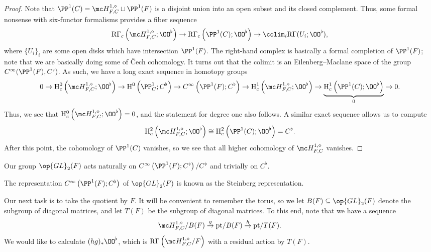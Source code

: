 \documentclass[../notes.tex]{subfiles}
\begin{document}
\begin{proof}
	Note that $\PP^1(C)=\mc H^{1,\diamond}_{F,C}\sqcup\PP^1(F)$ is a disjoint union into an open subset and its closed complement. Thus, some formal nonsense with six-functor formalisms provides a fiber sequence
	\[\mathrm R\Gamma_c\left(\mc H^{1,\diamond}_{F,C};\OO^\flat\right)\to\mathrm R\Gamma_c\left(\PP^1(C);\OO^\flat\right)\to\colim_i\mathrm R\Gamma(U_i;\OO^\flat),\]
	where $\{U_i\}_i$ are some open disks which have intersection $\PP^1(F)$. The right-hand complex is basically a formal completion of $\PP^1(F)$; note that we are basically doing some of \v{C}ech cohomology. It turns out that the colimit is an Eilenberg--Maclane space of the group $C^\infty(\PP^1(F),C^\flat)$. As such, we have a long exact sequence in homotopy groups
	\[0\to\mathrm H^0_c\left(\mc H^{1,\diamond}_{F,C};\OO^\flat\right)\to\mathrm H^0\left(\PP^1_C;C^\flat\right)\to C^\infty\left(\PP^1(F);C^\flat\right)\to\mathrm H^1_c\left(\mc H^{1,\diamond}_{F,C};\OO^\flat\right)\to\underbrace{\mathrm H^1_c\left(\PP^1(C);\OO^\flat\right)}_0\to0.\]
	Thus, we see that $\mathrm H^0_c\left(\mc H^{1,\diamond}_{F,C};\OO^\flat\right)=0$, and the statement for degree one also follows. A similar exact sequence allows us to compute
	\[\mathrm H^2_c\left(\mc H^{1,\diamond}_{F,C};\OO^\flat\right)\cong\mathrm H^2_c\left(\PP^1(C);\OO^\flat\right)=C^\flat.\]
	After this point, the cohomology of $\PP^1(C)$ vanishes, so we see that all higher cohomology of $\mc H^{1,\diamond}_{F,C}$ vanishes. 
\end{proof}
\begin{remark}
	Our group $\op{GL}_2(F)$ acts naturally on $C^\infty\left(\PP^1(F);C^\flat\right)/C^\flat$ and trivially on $C^\flat$.
\end{remark}
\begin{remark}
	The representation $C^\infty\left(\PP^1(F);C^\flat\right)$ of $\op{GL}_2(F)$ is known as the Steinberg representation.
\end{remark}
Our next task is to take the quotient by $F$. It will be convenient to remember the torus, so we let $B(F)\subseteq\op{GL}_2(F)$ denote the subgroup of diagonal matrices, and let $T(F)$ be the subgroup of diagonal matrices. To this end, note that we have a sequence
\[\mc H^{1,\diamond}_{F,C}/B(F)\stackrel g\to\mathrm{pt}/B(F)\stackrel h\to\mathrm{pt}/T(F).\]
We would like to calculate $(hg)_*\OO^\flat$, which is $\mathrm R\Gamma\left(\mc H^{1,\diamond}_{F,C}/F\right)$ with a residual action by $T(F)$.
\end{document}
